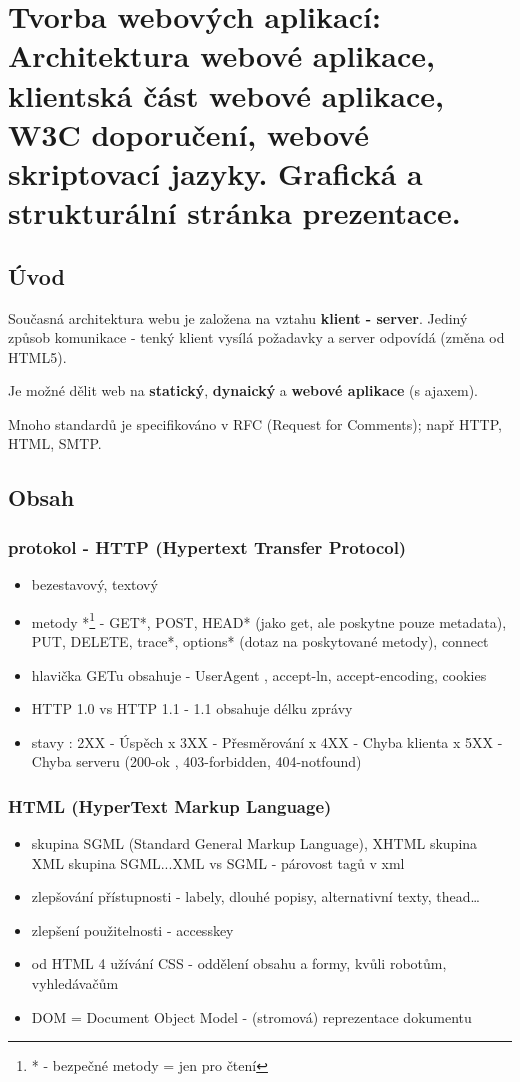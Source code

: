 \documentclass{scrreprt}
\begin{document}
\setcounter{chapter}{11}
\chapter{Tvorba webových aplikací: Architektura webové aplikace, klientská část webové aplikace, W3C doporučení, webové skriptovací jazyky.
Grafická a strukturální stránka prezentace.}

\section{Úvod}
Současná architektura webu je založena na vztahu \textbf{klient - server}. Jediný způsob komunikace - tenký klient vysílá požadavky a server odpovídá
(změna od HTML5). 

Je možné dělit web na \textbf{statický}, \textbf{dynaický} a \textbf{webové aplikace} (s ajaxem).

Mnoho standardů je specifikováno v RFC (Request for Comments); např HTTP, HTML, SMTP. 

\section{Obsah}

\subsection{protokol - HTTP (Hypertext Transfer Protocol)}
\begin{itemize}
  \item bezestavový, textový
  \item metody *\footnote{* - bezpečné metody = jen pro čtení} - GET*, POST, HEAD* (jako get, ale poskytne pouze metadata), PUT, DELETE, trace*,
  options* (dotaz na poskytované metody), connect  
  \item hlavička GETu obsahuje - UserAgent , accept-ln, accept-encoding, cookies
  \item HTTP 1.0 vs HTTP 1.1  -  1.1 obsahuje délku zprávy
  \item stavy : 2XX - Úspěch x 3XX - Přesměrování x 4XX - Chyba klienta x 5XX - Chyba serveru  (200-ok , 403-forbidden, 404-notfound)
\end{itemize}        
    
\subsection{HTML (HyperText Markup Language)}
\begin{itemize}
  \item skupina SGML (Standard General Markup Language), XHTML skupina XML skupina SGML...XML vs SGML - párovost tagů v xml
  \item zlepšování přístupnosti - labely, dlouhé popisy, alternativní texty, thead\ldots
  \item zlepšení použitelnosti - accesskey
  \item od HTML 4 užívání CSS - oddělení obsahu a formy, kvůli robotům, vyhledávačům
  \item DOM = Document Object Model - (stromová) reprezentace dokumentu
\end{itemize}
\end{document}
